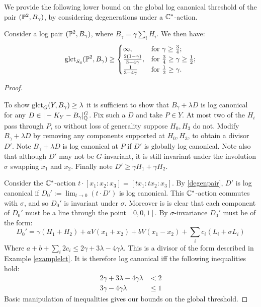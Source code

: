 We provide the following lower bound on the global log canonical threshold of the pair \((\mathbb{P}^2,B_\gamma)\), by considering degenerations under a \(\mathbb{C}^*\)-action. 
\begin{lemma}\label{lem:alph}
Consider a log pair \((\mathbb{P}^2,B_\gamma)\), where \(B_\gamma = \gamma \sum_i H_i\). We then have:
\[
\operatorname{glct}_{S_4}(\mathbb{P}^2, B_\gamma) \ge
\begin{cases}
\infty, & \text{for } \gamma \ge \frac{3}{4};\\
\frac{2(1-\gamma)}{3-4\gamma}, & \text{for } \frac{3}{4} \ge \gamma \ge \frac{1}{2};\\
\frac{1}{3-4 \gamma} & \text{for } \frac{1}{2} \ge \gamma.
\end{cases}
\]
\end{lemma}
\begin{proof} \

To show \(\operatorname{glct}_{G}(Y,B_\gamma) \ge \lambda\) it is sufficient to show that \(B_\gamma+\lambda D\) is log canonical for any \( D \in |-K_Y - B_\gamma|_{\mathbb{Q}}^G\). Fix such a \(D\) and take \(P \in Y\). At most two of the \(H_i\) pass through \(P\), so without loss of generality suppose \(H_0,H_3\) do not. Modify \(B_\gamma+\lambda D\) by removing any components supported at \(H_0,H_3\), to obtain a divisor \(D'\). Note \(B_\gamma+\lambda D\) is log canonical at \(P\) if \(D'\) is globally log canonical. Note also that although \(D'\) may not be \(G\)-invariant, it is still invariant under the involution \(\sigma \) swapping \(x_1\) and \(x_2\). Finally note \(D' \ge \gamma H_1 + \gamma H_2\).

Consider the \(\mathbb{C}^*\)-action \(t \cdot [x_1:x_2:x_3] = [ t x_1: t x_2 : x_3]\). By \ref{degenpair}, \(D'\) is log canonical if \(D_0' := \lim_{t \to 0} \left( t \cdot D' \right) \) is log canonical. This \(\mathbb{C}^*\)-action commutes with \(\sigma \), and so \(D_0'\) is invariant under \(\sigma\). Moreover is is clear that each component of \(D_0'\) must be a line through the point \([0,0,1]\). By \(\sigma\)-invariance \(D_0'\) must be of the form:
\[
D_0' = \gamma (H_1+H_2) + a V (x_1+x_2) + b V(x_1-x_2) + \sum_i c_i (L_i + \sigma L_i)
\]
Where \(a + b + \sum_i 2 c_i \le 2 \gamma + 3\lambda - 4 \gamma \lambda\). This is a divisor of the form described in Example \ref{examplelct}. It is therefore log canonical iff the following inequalities hold:
\begin{align*}
2\gamma + 3 \lambda - 4\gamma \lambda &< 2 \\
3\gamma - 4\gamma \lambda &\le 1
\end{align*}
Basic manipulation of inequalities gives our bounds on the global threshold.
\end{proof}
